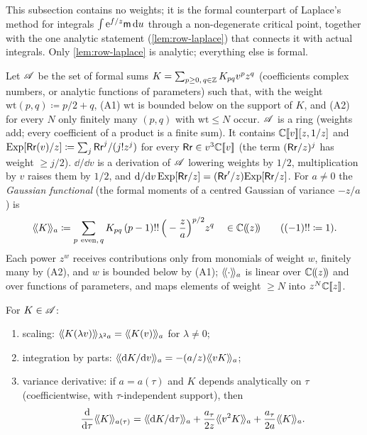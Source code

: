 This subsection contains no weights; it is the formal counterpart of Laplace's method for integrals $\int\mathrm{e}^{f/z}\mathsf{m}\,\mathrm{d} u$ through a non-degenerate critical point, together with the one analytic statement (\cref{lem:row-laplace}) that connects it with actual integrals. Only \cref{lem:row-laplace} is analytic; everything else is formal.

\begin{defn}
\label{def:row-Acal}
Let $\mathscr{A}$ be the set of formal sums $K=\sum_{p\geq0,\,q\in\mathbb{Z}}K_{pq}v^pz^q$ (coefficients complex numbers, or analytic functions of parameters) such that, with the weight $\mathrm{wt}(p,q)\coloneqq p/2+q$, (A1) $\mathrm{wt}$ is bounded below on the support of $K$, and (A2) for every $N$ only finitely many $(p,q)$ with $\mathrm{wt}\leq N$ occur. $\mathscr{A}$ is a ring (weights add; every coefficient of a product is a finite sum). It contains $\mathbb{C}[\![ v ]\!][z,1/z]$ and $\mathrm{Exp}[\mathsf{Rr}(v)/z]\coloneqq\sum_j\mathsf{Rr}^j/(j!z^j)$ for every $\mathsf{Rr}\in v^3\mathbb{C}[\![ v ]\!]$ (the term $(\mathsf{Rr}/z)^j$ has weight $\geq j/2$). $\dd/\dd v$ is a derivation of $\mathscr{A}$ lowering weights by $1/2$, multiplication by $v$ raises them by $1/2$, and $\mathrm{d}/\mathrm{d} v\,\mathrm{Exp}[\mathsf{Rr}/z]=(\mathsf{Rr}'/z)\mathrm{Exp}[\mathsf{Rr}/z]$. For $a\neq0$ the \emph{Gaussian functional} (the formal moments of a centred Gaussian of variance $-z/a$) is
\begin{equation}
\label{eq:row-gaussfun}
\gauss{K}{a}\coloneqq\sum_{p\ \mathrm{even},\,q}K_{pq}\,(p-1)!!\,\Big(-\frac za\Big)^{p/2}z^q\quad\in\Cz\qquad((-1)!!\coloneqq1).
\end{equation}
Each power $z^w$ receives contributions only from monomials of weight $w$, finitely many by (A2), and $w$ is bounded below by (A1); $\langle\!\langle \cdot\rangle\!\rangle_{a}$ is linear over $\mathbb{C}(\!(z)\!)$ and over functions of parameters, and maps elements of weight $\geq N$ into $z^N\mathbb{C}[\![ z ]\!]$.
\end{defn}

\begin{lem}
\label{lem:row-gauss}
For $K\in\mathscr{A}$:
\begin{enumerate}
\item[(G0)] scaling: $\langle\!\langle K(\lambda v)\rangle\!\rangle_{\lambda^2a}=\langle\!\langle K(v)\rangle\!\rangle_{a}$ for $\lambda\neq0$;
\item[(G1)] integration by parts: $\langle\!\langle \mathrm{d} K/\mathrm{d} v\rangle\!\rangle_{a}=-(a/z)\langle\!\langle vK\rangle\!\rangle_{a}$;
\item[(G2)] variance derivative: if $a=a(\tau)$ and $K$ depends analytically on $\tau$ (coefficientwise, with $\tau$-independent support), then
\[
\frac{\dd}{\dd\tau}\gauss{K}{a(\tau)}=\gauss{\dd K/\dd\tau}{a}+\frac{a_\tau}{2z}\gauss{v^2K}{a}+\frac{a_\tau}{2a}\gauss{K}{a}.
\]
\end{enumerate}
\end{lem}

